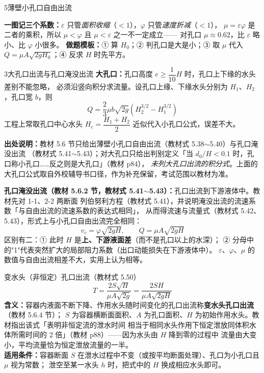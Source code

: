 \begin{kaodian}{5}{薄壁小孔口自由出流}
\begin{banfa}
\textbf{一图记三个系数：}$\varepsilon$ 只管\emph{面积收缩}（$<1$），$\varphi$ 只管\emph{速度折减}（$<1$），
$\mu=\varepsilon\varphi$ 是二者的乘积，所以 $\mu<\varphi$ 且 $\mu<\varepsilon$ 之一不一定成立——
对孔口 $\mu\approx0.62$，比 $\varepsilon$ 略小、比 $\varphi$ 小很多。
\textbf{做题模板：}① 算 $H_0$；② 判孔口是大是小；③ 取 $\mu$ 代入 $Q=\mu A\sqrt{2gH_0}$；④ 反求 $H$ 时先平方。
\end{banfa}
\end{kaodian}

\begin{kaodian}{3}{大孔口出流与孔口淹没出流}
\textbf{大孔口：}孔口高度 $e\ge\dfrac{1}{10}H$ 时，孔口上下缘的水头差别不能忽略，
必须沿竖向积分求流量。设孔口上缘、下缘水头分别为 $H_1$、$H_2$，孔口宽 $b$，则
\[ Q=\frac{2}{3}\mu b\sqrt{2g}\left(H_2^{3/2}-H_1^{3/2}\right) \]
工程上常取孔口中心水头 $H_c=\dfrac{H_1+H_2}{2}$ 近似代入小孔口公式，误差不大。

\noindent\textbf{出处说明：}教材 5.6 节只给出薄壁小孔口自由出流（教材式 5.38$\sim$5.40）与孔口淹没出流
（教材式 5.41$\sim$5.43）；对大孔口只给出判别定义「当 $d_0/H<0.1$ 时，孔口称小孔口……反之则是大孔口」（教材 p84），
\emph{未列大孔口出流的积分式}。上面的大孔口公式取自外校辅导书口径，作为补充保留，考试范围以教材为准。

\textbf{孔口淹没出流（教材 5.6.2 节，教材式 5.41$\sim$5.43）：}孔口出流到下游液体中。教材先对 1-1、2-2 两断面
列伯努利方程（教材式 5.41），并说明淹没出流的流速系数「与自由出流的流速系数的表达式相同」，
从而得流速与流量式（教材式 5.42、5.43），形式上与小孔口自由出流完全相同：
\[ v_c=\varphi\sqrt{2gH},\qquad Q=\mu A\sqrt{2gH} \]
区别有二：① 此时 $H$ 是\textbf{上、下游液面差}（而不是孔口以上的水深）；
② 分母中的"1"代表突然扩大的局部阻力系数（出口动能损失在下游液体中）。
$\varepsilon$、$\varphi$、$\mu$ 的数值与自由出流相差不大，实用上认为相等。

\begin{gongshi}{变水头（非恒定）孔口出流（教材式 5.50）}
\[ T=\frac{2S\sqrt{H}}{\mu A\sqrt{2g}}=\frac{2SH}{\mu A\sqrt{2gH}} \]
\textbf{含义：}容器内液面不断下降、作用水头随时间变化的孔口出流称\textbf{变水头孔口出流}（教材 5.6.4 节）；
$S$ 为容器横断面面积、$A$ 为孔口面积、$H$ 为初始作用水头。教材指出该式「表明非恒定流的泄水时间
相当于相同水头作用下恒定泄放同体积水体所需时间的 2 倍」（教材 p88）——因为水头由 $H$ 降到零的过程中
流量由大变小，平均流量恰为恒定泄放流量的一半。\\
\textbf{适用条件：}容器断面 $S$ 在泄水过程中不变（或按平均断面处理）、孔口为小孔口且 $\mu$ 视为常数；
泄空至某一水头 $h$ 时，把式中的 $H$ 换成相应水头即可。
\end{gongshi}


\end{kaodian}
